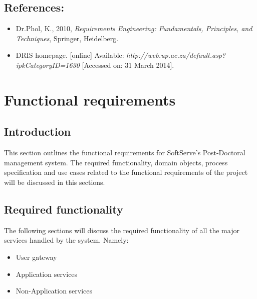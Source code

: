 \documentclass[12pt]{article}
\begin{document}
\vspace{0.2in}

\subsection{References:}
\vspace{0.1in}
\begin{itemize}
\item Dr.Phol, K., 2010, \textit{Requirements Engineering: Fundamentals, Principles, and Techniques}, Springer, Heidelberg.
\item DRIS homepage. [online] Available: \textit{http://web.up.ac.za/default.asp?ipkCategoryID=1630} [Accessed on: 31 March 2014].
\end{itemize}	

\vspace{0.5in}

\newpage
\section{Functional requirements}
\subsection{Introduction} %
\vspace{0.2in}
This section outlines the functional requirements for SoftServe's Post-Doctoral management system.
The required functionality, domain objects, process specification and use cases related to the functional requirements of the project will be discussed in this sections.
\vspace{0.2in}

\subsection{Required functionality} %
\vspace{0.2in}
The following sections will discuss the required functionality of all the major services handled by the system. Namely:
\begin{itemize}
	\item User gateway
	\item Application services
	\item Non-Application services
\end{itemize}
\end{document}
